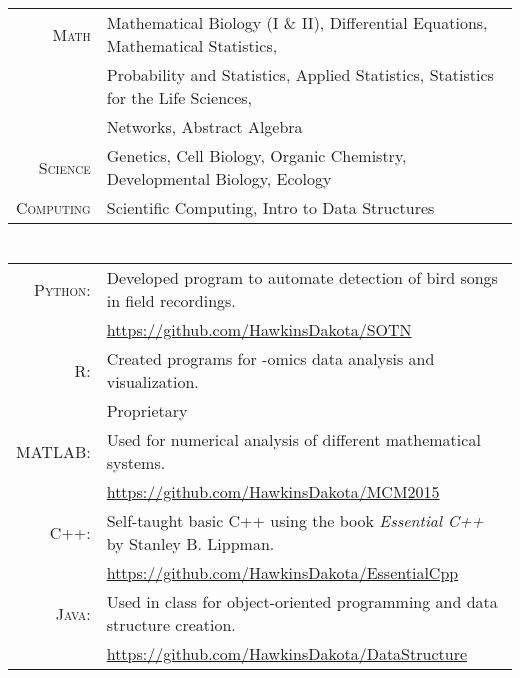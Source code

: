 \documentclass[a4paper,10pt]{article}
\begin{document}
\section{\color{linkcolour}{Relevant Course Work}}
\begin{tabular}{rl}
\textsc{Math} & Mathematical Biology (I \& II), Differential Equations, Mathematical Statistics,
\\ & Probability and Statistics, Applied Statistics, Statistics for the Life Sciences,
\\ & Networks, Abstract Algebra \\
\textsc{Science} & Genetics, Cell Biology, Organic Chemistry, Developmental Biology, Ecology \\
\textsc{Computing} & Scientific Computing, Intro to Data Structures
\end{tabular}

\section{\color{linkcolour}{Programming Languages}}
\begin{tabular}{rl}
 \textsc{Python:}& Developed program to automate detection of bird songs in field recordings.\\
& \small{\href{https://github.com/HawkinsDakota/SOTN}{https://github.com/HawkinsDakota/SOTN}}\\
\textsc{R:}& Created programs for -omics data analysis and visualization.\\
& \small{Proprietary} \\
\textsc{MATLAB:}& Used for numerical analysis of different mathematical systems.\\
& \small{\href{https://github.com/HawkinsDakota/MCM2015}{https://github.com/HawkinsDakota/MCM2015}}\\
\textsc{C++:} & Self-taught basic C++ using the book \emph{Essential C++} by Stanley B. Lippman.\\
& \small{\href{https://github.com/HawkinsDakota/EssentialCpp}{https://github.com/HawkinsDakota/EssentialCpp}} \\
\textsc{Java:}& Used in class for object-oriented programming and data structure creation.\\
& \small{\href{https://github.com/HawkinsDakota/DataStructure}{https://github.com/HawkinsDakota/DataStructure}}
\end{tabular}

\end{document}
